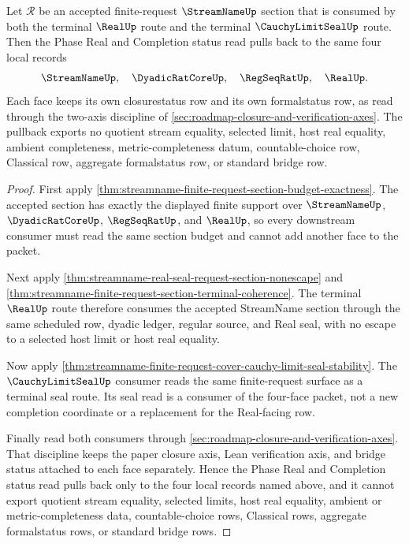 \begin{theorem}
\label{thm:streamname-finite-request-section-status-pullback}
Let $\mathcal{R}$ be an accepted finite-request $\StreamNameUp$ section that is
consumed by both the terminal $\RealUp$ route and the terminal
$\CauchyLimitSealUp$ route. Then the Phase Real and Completion status read
pulls back to the same four local records
$$
\StreamNameUp,\quad \DyadicRatCoreUp,\quad \RegSeqRatUp,\quad \RealUp.
$$
Each face keeps its own closurestatus row and its own formalstatus row, as read
through the two-axis discipline of
\autoref{sec:roadmap-closure-and-verification-axes}. The pullback exports no
quotient stream equality, selected limit, host real equality, ambient
completeness, metric-completeness datum, countable-choice row, Classical row,
aggregate formalstatus row, or standard bridge row.
\end{theorem}
\begin{proof}
First apply
\autoref{thm:streamname-finite-request-section-budget-exactness}. The accepted
section has exactly the displayed finite support over $\StreamNameUp$,
$\DyadicRatCoreUp$, $\RegSeqRatUp$, and $\RealUp$, so every downstream consumer
must read the same section budget and cannot add another face to the packet.

Next apply
\autoref{thm:streamname-real-seal-request-section-nonescape} and
\autoref{thm:streamname-finite-request-section-terminal-coherence}. The
terminal $\RealUp$ route therefore consumes the accepted StreamName section
through the same scheduled row, dyadic ledger, regular source, and Real seal,
with no escape to a selected host limit or host real equality.

Now apply
\autoref{thm:streamname-finite-request-cover-cauchy-limit-seal-stability}.
The $\CauchyLimitSealUp$ consumer reads the same finite-request surface as a
terminal seal route. Its seal read is a consumer of the four-face packet, not a
new completion coordinate or a replacement for the Real-facing row.

Finally read both consumers through
\autoref{sec:roadmap-closure-and-verification-axes}. That discipline keeps the
paper closure axis, Lean verification axis, and bridge status attached to each
face separately. Hence the Phase Real and Completion status read pulls back
only to the four local records named above, and it cannot export quotient stream
equality, selected limits, host real equality, ambient or metric-completeness
data, countable-choice rows, Classical rows, aggregate formalstatus rows, or
standard bridge rows.
\end{proof}

